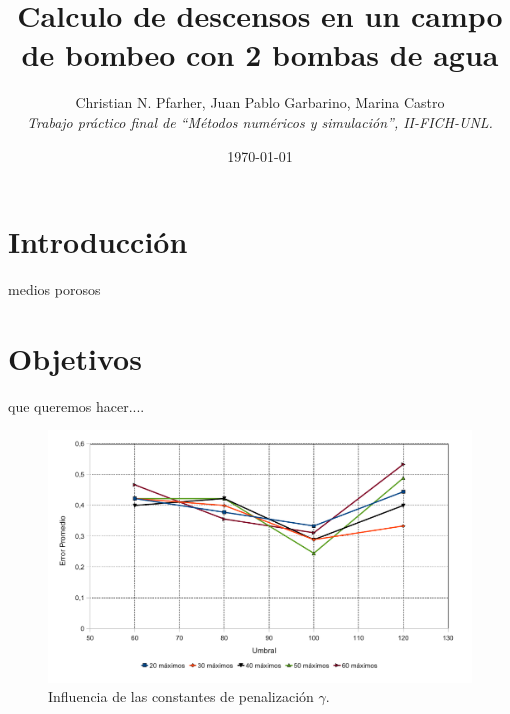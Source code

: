 \documentclass[10pt,a4paper,final]{article}
\begin{document}
\title{Calculo de descensos en un campo de bombeo con 2 bombas de agua}
\author{Christian N. Pfarher, Juan Pablo Garbarino, Marina Castro\\
\textit{Trabajo práctico final de ``Métodos numéricos y simulación'', II-FICH-UNL.}}
\date{\today}
\maketitle
\newpage
\tableofcontents
\newpage
\section{Introducción}
medios porosos
\section{Objetivos}
que queremos hacer....
\begin{figure}[tbhp]
\centerline{\includegraphics[scale=0.75]{img/estadistica_noche_iguales}}
\caption{Influencia de las constantes de penalización $\gamma$.}
\label{fig2}
\end{figure}
\end{document}
